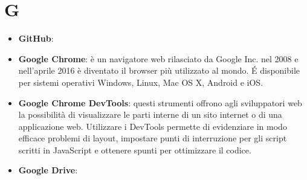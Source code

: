 \section{G}
\begin{itemize}
	\item \textbf{GitHub}: 
	\item \textbf{Google Chrome}: è un navigatore web rilasciato da Google Inc. nel 2008 e nell'aprile 2016 è diventato il browser più utilizzato al mondo. \'E disponibile per sistemi operativi Windows, Linux, Mac OS X, Android e iOS. 
	\item \textbf{Google Chrome DevTools}: questi strumenti offrono agli sviluppatori web la possibilità di visualizzare le parti interne di un sito internet o di una applicazione web. Utilizzare i DevTools permette di evidenziare in modo efficace problemi di layout, impostare punti di interruzione per gli script scritti in JavaScript e ottenere spunti per ottimizzare il codice.
	\item \textbf{Google Drive}: 
\end{itemize}
